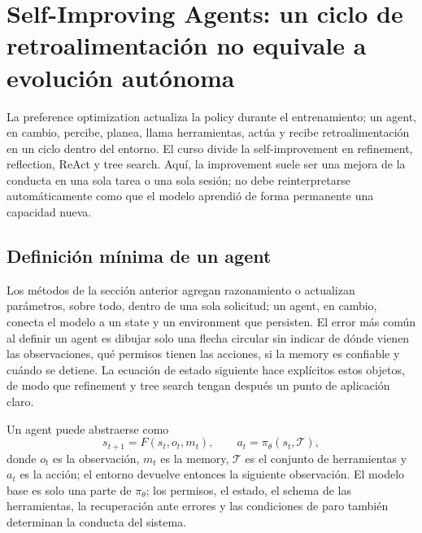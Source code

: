 \section{Self-Improving Agents: un ciclo de retroalimentación no equivale a evolución autónoma}

La preference optimization actualiza la policy durante el entrenamiento; un agent, en cambio, percibe, planea, llama herramientas, actúa y recibe retroalimentación en un ciclo dentro del entorno. El curso divide la self-improvement en refinement, reflection, ReAct y tree search. Aquí, la improvement suele ser una mejora de la conducta en una sola tarea o una sola sesión; no debe reinterpretarse automáticamente como que el modelo aprendió de forma permanente una capacidad nueva.

\subsection{Definición mínima de un agent}

Los métodos de la sección anterior agregan razonamiento o actualizan parámetros, sobre todo, dentro de una sola solicitud; un agent, en cambio, conecta el modelo a un state y un environment que persisten. El error más común al definir un agent es dibujar solo una flecha circular sin indicar de dónde vienen las observaciones, qué permisos tienen las acciones, si la memory es confiable y cuándo se detiene. La ecuación de estado siguiente hace explícitos estos objetos, de modo que refinement y tree search tengan después un punto de aplicación claro.

Un agent puede abstraerse como
\[
s_{t+1}=F(s_t,o_t,m_t),\qquad a_t=\pi_{\theta}(s_t,\mathcal{T}),
\]
donde $o_t$ es la observación, $m_t$ es la memory, $\mathcal{T}$ es el conjunto de herramientas y $a_t$ es la acción; el entorno devuelve entonces la siguiente observación. El modelo base es solo una parte de $\pi_{\theta}$; los permisos, el estado, el schema de las herramientas, la recuperación ante errores y las condiciones de paro también determinan la conducta del sistema.




